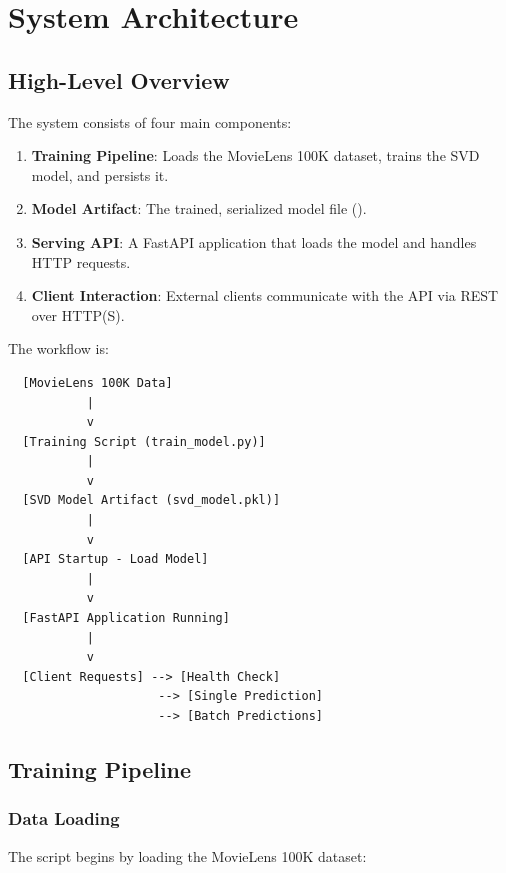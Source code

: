 \section{System Architecture}
\label{sec:architecture}

\subsection{High-Level Overview}

The system consists of four main components:

\begin{enumerate}
  \item \textbf{Training Pipeline}: Loads the MovieLens 100K dataset, trains the SVD model, and persists it.
  \item \textbf{Model Artifact}: The trained, serialized model file ().
  \item \textbf{Serving API}: A FastAPI application that loads the model and handles HTTP requests.
  \item \textbf{Client Interaction}: External clients communicate with the API via REST over HTTP(S).
\end{enumerate}

The workflow is:

\begin{verbatim}
  [MovieLens 100K Data]
           |
           v
  [Training Script (train_model.py)]
           |
           v
  [SVD Model Artifact (svd_model.pkl)]
           |
           v
  [API Startup - Load Model]
           |
           v
  [FastAPI Application Running]
           |
           v
  [Client Requests] --> [Health Check]
                     --> [Single Prediction]
                     --> [Batch Predictions]
\end{verbatim}

\subsection{Training Pipeline}

\subsubsection{Data Loading}

The  script begins by loading the MovieLens 100K dataset:



